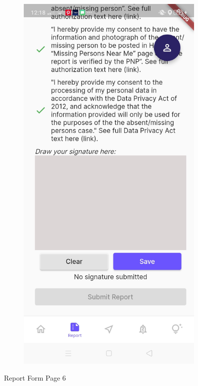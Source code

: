 \begin{figure}[!h]
\begin{subfigure}[c]{0.40\linewidth}
    \end{subfigure}
    \centering
    \begin{subfigure}[c]{0.40\linewidth}
        \centering
        \includegraphics[scale=0.15]{figures/Chapter4/Main/p6-2.jpg}
    \end{subfigure}
    \caption{Report Form Page 6}
    \label{fig:ReportPage6}
\end{figure}
